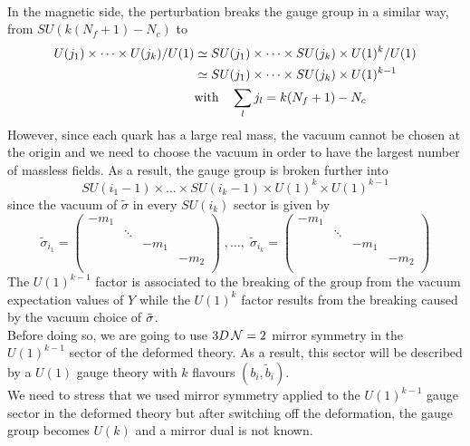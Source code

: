 \\
In the magnetic side, the perturbation breaks the gauge group in a similar way, from $SU( k (N_f+1) - N_c)$ to
\begin{align} 
U(j_1) \times \dots \times U(j_k) / U(1) &  \simeq  SU(j_1) \times \dots \times SU(j_k) \times U(1)^{k}/U(1) \\  
 & \simeq  SU(j_1) \times \dots \times SU(j_k) \times U(1)^{k-1}\\
 & \hbox{with} \quad\sum_l j_l = k (N_f+1) - N_c  \;
\end{align} 
However, since each quark has a large real mass, the vacuum cannot be chosen at the origin and we need to choose the vacuum in order to have the largest number of massless fields.
As a result, the gauge group is broken further into
\begin{equation}
SU(i_1 -1 ) \times \dots \times SU(i_k -1 ) \times U(1)^{k} \times U(1)^{k-1}
\end{equation}
since the vacuum of $\tilde{\sigma}$ in every $SU(i_k)$ sector is given by  
\begin{equation}
\tilde{\sigma}_{i_1} = 
\begin{pmatrix}
 - m_1 & \\
  & \ddots  \\
  & & - m_1 & \\
  & & & - m_2 \\
\end{pmatrix}
 \; ,
 \dotsc 
,
\;
\tilde{\sigma}_{i_k} = 
\begin{pmatrix}
 - m_1 & \\
  & \ddots  \\
  & & - m_1 & \\
  & & & - m_2 \\
\end{pmatrix}
\label{eqn:reduction_sun_sigma_vev}
\end{equation}
The $U(1)^{k-1}$ factor is associated to the breaking of the group from the vacuum expectation values of $Y$ while the $U(1)^k$ factor results from the breaking caused by the vacuum choice of $\tilde{ \sigma}$.\\
Before doing so, we are going to use $3D \, \mathcal{N}=2$ mirror symmetry \cite{Aharony:1997bx} in the $U(1)^{k-1}$ sector of the deformed theory.
As a result, this sector will be described by a $ U(1)$  gauge theory with $k$ flavours $(b_i, \tilde{b}_i)$.\\
We need to stress that we used mirror symmetry applied to the $U(1)^{k-1}$ gauge sector in the deformed theory but after switching off the deformation, the gauge group becomes $U(k)$ and a mirror dual is not known.\\
